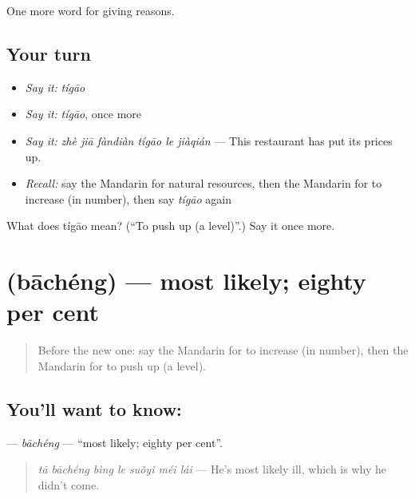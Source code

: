 \begin{grammarlens}[title={What you've built}]
One more word for giving reasons.
\end{grammarlens}

\subsection*{Your turn}
\begin{itemize}
\raggedright
  \item \emph{Say it:} \emph{tígāo}
  \item \emph{Say it:} \emph{tígāo}, once more
  \item \emph{Say it:} \emph{zhè jiā fàndiàn tígāo le jiàqián} — This restaurant has put its prices up.
  \item \emph{Recall:} say the Mandarin for natural resources, then the Mandarin for to increase (in number), then say \emph{tígāo} again
\end{itemize}

\begin{tcolorbox}[breakable,colback=teal!4,colframe=teal!35!black,title={Before you move on}]
What does tígāo mean? (\textquotedblleft{}To push up (a level)\textquotedblright{}.) Say it once more.
\end{tcolorbox}
\section[\texorpdfstring{\zh{八成} (bāchéng)}{八成 (bāchéng)}]{ (bāchéng) — most likely; eighty per cent}

\label{lesson:ZH-C385-bacheng}



\begin{quote}
Before the new one: say the Mandarin for to increase (in number), then the Mandarin for to push up (a level).
\end{quote}

\subsection*{You'll want to know: }
\textbf{} — \emph{bāchéng} — \textquotedblleft{}most likely; eighty per cent\textquotedblright{}.

\begin{quote}
\textbf{} \emph{tā bāchéng bìng le suǒyǐ méi lái} — He's most likely ill, which is why he didn't come.
\end{quote}

